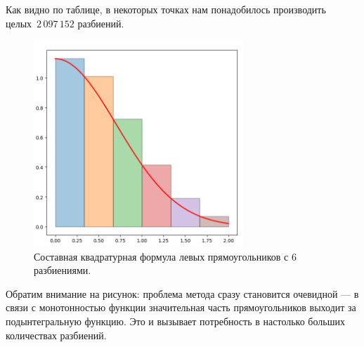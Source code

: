 \documentclass[a4paper, 14pt]{extarticle}
\begin{document}
    Как видно по таблице, в некоторых точках нам понадобилось производить целых~$2\,097\,152$ разбиений.

    \begin{figure}[H]
        \centering
        \includegraphics[width=0.7\textwidth]{img/left}
        \caption{Составная квадратурная формула левых прямоугольников с 6 разбиениями.}
        \label{fig:left}
    \end{figure}

    Обратим внимание на рисунок: проблема метода сразу становится очевидной --- в связи с монотонностью функции
    значительная часть прямоугольников выходит за подынтегральную функцию.
    Это и вызывает потребность в настолько больших количествах разбиений.
\end{document}
